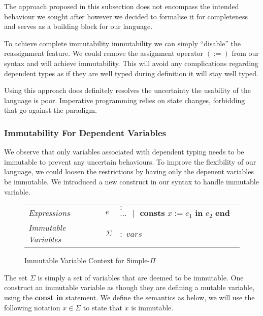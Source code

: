 \documentclass[a4paper,12pt]{report}
\begin{document}
\par
The approach proposed in this subsection does not encompass the intended behaviour we 
sought after however we decided to formalise it for completeness and serves as 
a building block for our language. 

\par
To achieve complete immutability immutability we can simply ``disable'' the 
reassignment feature. We could remove the assignment operator $(:=)$ from our 
syntax and will achieve immutability. This will avoid any complications 
regarding dependent types as 
if they are well typed during definition it will stay well typed. 

\par
Using this approach does definitely resolves the uncertainty the usability of 
the language is poor. Imperative programming relies on state changes, forbidding 
that go against the paradigm. 

\subsubsection{Immutability For Dependent Variables}
We observe that only variables associated with dependent typing needs to be 
immutable to prevent any uncertain behaviours. To improve the flexibility of our 
language, we could loosen the restrictions by having only the depenent variables 
be immutable. We introduced a new construct in our syntax to handle immutable 
variable. 

\begin{figure}[H]
  \begin{center}
    \begin{tabular} {l l l}
      \textit{Expressions} & $e$& $:$ $...\text{ }|\text{ }
        \textbf{consts }x := e_1 \textbf{ in }e_2\textbf{ end}$ \\
      \textit{Immutable Variables} & $\Sigma$ & $:$ $vars$ \\
    \end{tabular}
  \end{center}
  \caption{Immutable Variable Context for Simple-$\Pi$}
\end{figure}

The set $\Sigma$ is simply a set of variables that are deemed to be immutable. 
One construct an immutable variable as though they are defining a mutable 
variable, using the \textbf{const in} statement. We define the semantics as 
below, we will use the following notation $x \in \Sigma$ to state that $x$ is 
immutable.
\end{document}
